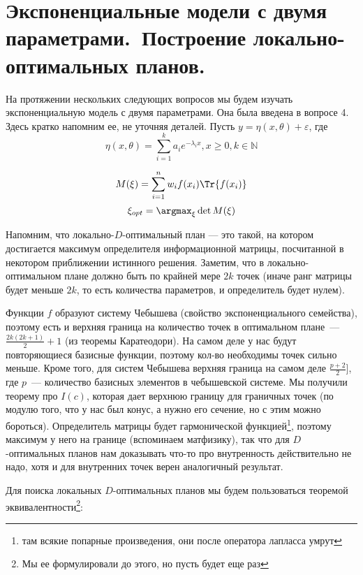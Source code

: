 \section{Экспоненциальные модели с двумя параметрами. Построение локально-оптимальных планов.}
 
На протяжении нескольких следующих вопросов мы будем изучать экспоненциальную модель с двумя параметрами.
Она была введена в вопросе 4. Здесь кратко напомним ее, не уточняя деталей.
Пусть $y = \eta(x, \theta) + \varepsilon$, где 
$$\eta(x,\theta) = \sum\limits_{i=1}^{k} a_i e^{-\lambda_ix}, x \ge 0, k \in \mathbb{N}$$

$$M(\xi) = \sum \limits_{i=1}^{n} w_if(x_i)\Tr{f(x_i)}$$
$$\xi_{opt} = \argmax_{\xi} \det M(\xi)$$

Напомним, что локально-$D$-оптимальный план --- это такой, на котором достигается максимум определителя информационной матрицы, посчитанной в некотором приближении истинного решения.
Заметим, что в локально-оптимальном плане должно быть по крайней мере $2k$ точек (иначе ранг матрицы будет меньше $2k$, то есть количества параметров, и определитель будет нулем). 

\begin{note}
Функции $f$ образуют систему Чебышева (свойство экспоненциального семейства), поэтому есть и верхняя граница на количество точек в оптимальном плане — $\frac{2k(2k+1)}{2}+1$ (из теоремы Каратеодори). На самом деле у нас будут повторяющиеся базисные функции, поэтому кол-во необходимы точек сильно меньше. Кроме того, для систем Чебышева верхняя граница на самом деле $\frac{p + 2}{2}]$, где $p$ — количество базисных элементов в чебышевской системе. Мы получили теорему про $I(c)$, которая дает верхнюю границу для граничных точек (по модулю того, что у нас был конус, а нужно его сечение, но с этим можно бороться). Определитель матрицы будет гармонической функцией\footnote{там всякие попарные произведения, они после оператора лапласса умрут}, поэтому максимум у него на границе (вспоминаем матфизику), так что для $D$-оптимальных планов нам доказывать что-то про внутренность действительно не надо, хотя и для внутренних точек верен аналогичный результат.
\end{note}

Для поиска локальных $D$-оптимальных планов мы будем пользоваться теоремой эквивалентности\footnote{Мы ее формулировали до этого, но пусть будет еще раз}:


